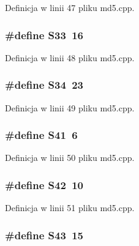 Definicja w linii 47 pliku md5.cpp.\hypertarget{a00010_1c854214533f6220e859b0063196abb3}{
\subsubsection[{S33}]{\setlength{\rightskip}{0pt plus 5cm}\#define S33~16}}
\label{d7/dec/a00010_1c854214533f6220e859b0063196abb3}




Definicja w linii 48 pliku md5.cpp.\hypertarget{a00010_f6472be1d535970afee8e5266a74aa07}{
\subsubsection[{S34}]{\setlength{\rightskip}{0pt plus 5cm}\#define S34~23}}
\label{d7/dec/a00010_f6472be1d535970afee8e5266a74aa07}




Definicja w linii 49 pliku md5.cpp.\hypertarget{a00010_b674ba129e588da55d1d494e1cf3c15e}{
\subsubsection[{S41}]{\setlength{\rightskip}{0pt plus 5cm}\#define S41~6}}
\label{d7/dec/a00010_b674ba129e588da55d1d494e1cf3c15e}




Definicja w linii 50 pliku md5.cpp.\hypertarget{a00010_268ef1a49114a94b931cc6b313e3cd1b}{
\subsubsection[{S42}]{\setlength{\rightskip}{0pt plus 5cm}\#define S42~10}}
\label{d7/dec/a00010_268ef1a49114a94b931cc6b313e3cd1b}




Definicja w linii 51 pliku md5.cpp.\hypertarget{a00010_5aaa7121f39650d472746942ca68f959}{
\subsubsection[{S43}]{\setlength{\rightskip}{0pt plus 5cm}\#define S43~15}}
\label{d7/dec/a00010_5aaa7121f39650d472746942ca68f959}




